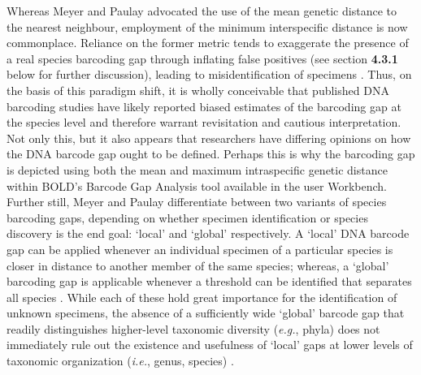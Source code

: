 Whereas Meyer and Paulay \cite{meyer2005dna} advocated the use of the mean genetic distance to the nearest neighbour, employment of the minimum interspecific distance is now \\ commonplace. Reliance on the former metric tends to exaggerate the presence of a real species barcoding gap through inflating false positives (see section \textbf{4.3.1} below for further discussion), leading to misidentification of specimens \cite{meier2008use}. Thus, on the basis of this paradigm shift, it is wholly conceivable that published DNA barcoding studies have likely reported biased estimates of the barcoding gap at the species level and therefore warrant revisitation and cautious interpretation. Not only this, but it also appears that researchers have differing opinions on how the DNA barcode gap ought to be defined. Perhaps this is why the barcoding gap is depicted using both the mean and maximum intraspecific genetic distance within BOLD's Barcode Gap Analysis tool available in the user Workbench. Further still, Meyer and Paulay \cite{meyer2005dna} differentiate between two variants of species \\ barcoding gaps, depending on whether specimen identification or species discovery is the end goal: `local' and `global' respectively. A `local' DNA barcode gap can be applied whenever an individual specimen of a particular species is closer in distance to another member of the same species; whereas, a `global' barcoding gap is applicable whenever a threshold can be identified that separates all species \cite{collins2013seven}. While each of these hold great importance for the identification of unknown specimens, the absence of a sufficiently wide `global' barcode gap that readily distinguishes higher-level taxonomic diversity (\textit{e.g.}, phyla) does not immediately rule out the existence and usefulness of `local' gaps at lower levels of taxonomic organization (\textit{i.e.}, genus, species) \cite{koroiva2018estimating, kvist2017does}.  



